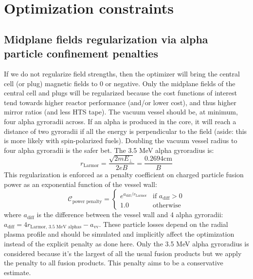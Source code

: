 \section{Optimization constraints}

\subsection{Midplane fields regularization via alpha particle confinement penalties}
If we do not regularize field strengths, then the optimizer will bring the central cell (or plug) magnetic fields to 0 or negative. Only the midplane fields of the central cell and plugs will be regularized because the cost functions of interest tend towards higher reactor performance (and/or lower cost), and thus higher mirror ratios (and less HTS tape).
The vacuum vessel should be, at minimum, four alpha gyroradii across. If an alpha is produced in the core, it will reach a distance of two gyroradii if all the energy is perpendicular to the field (aside: this is more likely with spin-polarized fuels). Doubling the vacuum vessel radius to four alpha gyroradii is the safer bet.
The 3.5 MeV alpha gyroradius is:
\begin{equation}
    r_\text{Larmor} = \frac{\sqrt{2 m E_\perp}}{2eB} = \frac{0.2694 \text{cm}}{B}
\end{equation}
This regularization is enforced as a penalty coefficient on charged particle fusion power as an exponential function of the vessel wall:
\begin{equation}
    \mathcal{C}_\text{power penalty} =
    \begin{cases}
        e^{{a_\text{diff} / r_\text{Larmor}}} & \text{if } a_\text{diff} > 0 \\ 
        1.0 & \text{otherwise}
    \end{cases}
\end{equation}
where $a_\text{diff}$ is the difference between the vessel wall and 4 alpha gyroradii: $a_\text{diff} = 4 r_\text{Larmor, 3.5 MeV alphas} - a_\text{vv}$. 
These particle losses depend on the radial plasma profile and should be simulated and implicitly affect the optimization instead of the explicit penalty as done here. Only the 3.5 MeV alpha gyroradius is considered because it's the largest of all the usual fusion products but we apply the penalty to all fusion products. This penalty aims to be a conservative estimate.


